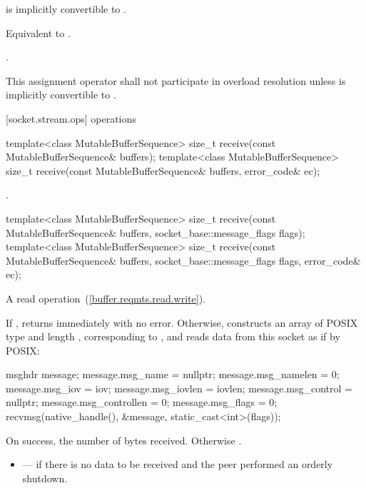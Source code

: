 \begin{itemdescr}
\pnum
\requires {} is implicitly convertible to .

\pnum
\effects Equivalent to .

\pnum
\returns {}.

\pnum
\remarks This assignment operator shall not participate in overload resolution unless  is implicitly convertible to .
\end{itemdescr}



[socket.stream.ops]{ operations}

\begin{itemdecl}
template<class MutableBufferSequence>
  size_t receive(const MutableBufferSequence& buffers);
template<class MutableBufferSequence>
  size_t receive(const MutableBufferSequence& buffers,
                 error_code& ec);
\end{itemdecl}

\begin{itemdescr}
\pnum
\returns {}.
\end{itemdescr}

\begin{itemdecl}
template<class MutableBufferSequence>
  size_t receive(const MutableBufferSequence& buffers,
                 socket_base::message_flags flags);
template<class MutableBufferSequence>
  size_t receive(const MutableBufferSequence& buffers,
                 socket_base::message_flags flags, error_code& ec);
\end{itemdecl}

\begin{itemdescr}
\pnum
A read operation~(\ref{buffer.reqmts.read.write}).

\pnum
\effects If , returns immediately with no error. Otherwise, constructs an array  of POSIX type  and length , corresponding to , and reads data from this socket as if by POSIX:
\begin{codeblock}
msghdr message;
message.msg_name = nullptr;
message.msg_namelen = 0;
message.msg_iov = iov;
message.msg_iovlen = iovlen;
message.msg_control = nullptr;
message.msg_controllen = 0;
message.msg_flags = 0;
recvmsg(native_handle(), &message, static_cast<int>(flags));
\end{codeblock}


\pnum
\returns On success, the number of bytes received. Otherwise .

\pnum
\errors
\begin{itemize}
\item
{} --- if there is no data to be received and the peer performed an orderly shutdown.
\end{itemize}
\end{itemdescr}

